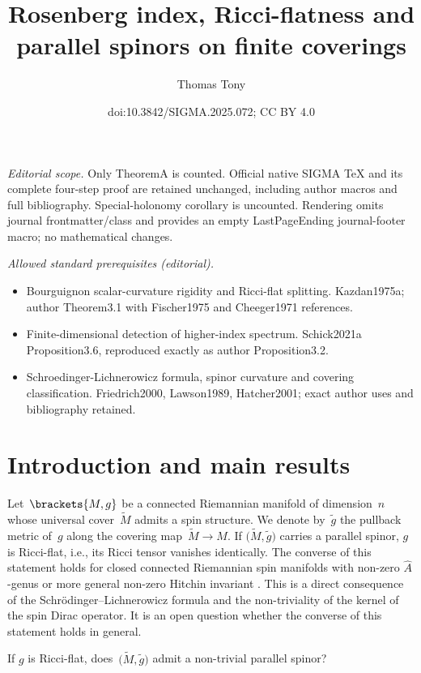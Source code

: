 \documentclass[10pt,a4paper]{amsart}
\title{Rosenberg index, Ricci-flatness and parallel spinors on finite coverings}
\author{Thomas Tony}
\date{doi:10.3842/SIGMA.2025.072; CC BY 4.0}
\numberwithin{equation}{section}
\begin{document}
\maketitle
\noindent\textit{Editorial scope.} Only TheoremA is counted. Official native SIGMA TeX and its complete four-step proof are retained unchanged, including author macros and full bibliography. Special-holonomy corollary is uncounted. Rendering omits journal frontmatter/class and provides an empty LastPageEnding journal-footer macro; no mathematical changes.\par\medskip
\noindent\textit{Allowed standard prerequisites (editorial).}\begin{itemize}
\item Bourguignon scalar-curvature rigidity and Ricci-flat splitting. Kazdan1975a; author Theorem3.1 with Fischer1975 and Cheeger1971 references.
\item Finite-dimensional detection of higher-index spectrum. Schick2021a Proposition3.6, reproduced exactly as author Proposition3.2.
\item Schroedinger-Lichnerowicz formula, spinor curvature and covering classification. Friedrich2000, Lawson1989, Hatcher2001; exact author uses and bibliography retained.
\end{itemize}\medskip
\section{Introduction and main results}

Let~$\brackets{M,g}$ be a connected Riemannian manifold of dimension~$n$ whose universal cover~$\tilde{M}$ admits a spin structure. We denote by~$\tilde{g}$ the pullback metric of~$g$ along the covering map~$\tilde{M}\to M$.
If $\bigl(\tilde{M},\tilde{g}\bigr)$ carries a parallel spinor, $g$ is Ricci-flat, i.e., its Ricci tensor vanishes identically. The converse of this statement holds for closed connected Riemannian spin manifolds with non-zero $\hat{A}$-genus or more general non-zero Hitchin invariant \cite[Section~4.2]{Hitchin1974}. This is a direct consequence of the Schr\"odinger--Lichnerowicz formula and the non-triviality of the kernel of the spin Dirac operator. It is an open question whether the converse of this statement holds in general.

\begin{que} \label{OpenQuestion}
 If $g$ is Ricci-flat, does~$\bigl(\tilde{M},\tilde{g}\bigr)$ admit a non-trivial parallel spinor?
\end{que}
\end{document}
